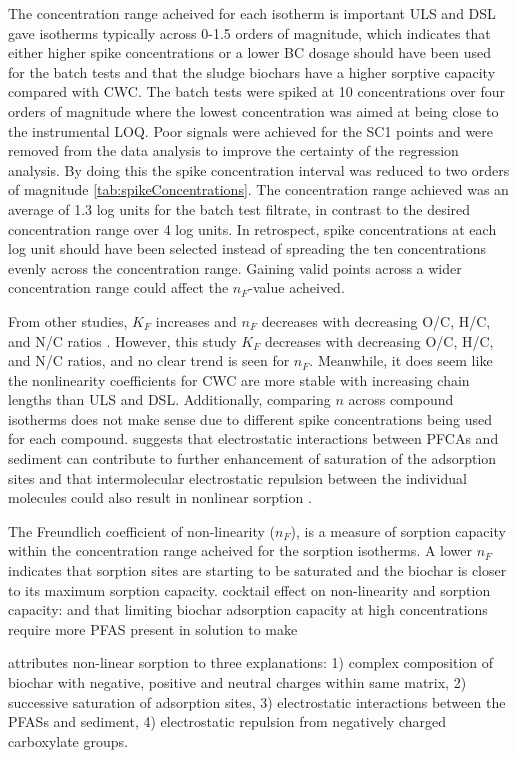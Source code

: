 The concentration range acheived for each isotherm is important  ULS and DSL gave isotherms typically across 0-1.5 orders of magnitude, which indicates that either higher spike concentrations or a lower BC dosage should have been used for the batch tests and that the sludge biochars have a higher sorptive capacity compared with CWC. The batch tests were spiked at 10 concentrations over four orders of magnitude where the lowest concentration was aimed at being close to the instrumental LOQ. Poor signals were achieved for the SC1 points and were removed from the data analysis to improve the certainty of the regression analysis. By doing this the spike concentration interval was reduced to two orders of magnitude \cref{tab:spikeConcentrations}. The concentration range achieved was an average of 1.3 log units for the batch test filtrate, in contrast to the desired concentration range over 4 log units. In retrospect, spike concentrations at each log unit should have been selected instead of spreading the ten concentrations evenly across the concentration range. Gaining valid points across a wider concentration range could affect the $n_F$-value acheived.

From other studies, $K_F$ increases and $n_F$ decreases with decreasing O/C, H/C, and N/C ratios \citep{Cornelissen2005}. However, this study $K_F$ decreases with decreasing O/C, H/C, and N/C ratios, and no clear trend is seen for $n_F$. Meanwhile, it does seem like the nonlinearity coefficients for CWC are more stable with increasing chain lengths than ULS and DSL. Additionally, comparing $n$ across compound isotherms does not make sense due to different spike concentrations being used for each compound. \citep{yin2022insights} suggests that electrostatic interactions between PFCAs and sediment can contribute to further enhancement of saturation of the adsorption sites and that intermolecular electrostatic repulsion between the individual molecules could also result in nonlinear sorption \citep{higgins2006sorption,yin2022insights}.

The Freundlich coefficient of non-linearity ($n_F$), is a measure of sorption capacity within the concentration range acheived for the sorption isotherms. A lower $n_F$ indicates that sorption sites are starting to be saturated and the biochar is closer to its maximum sorption capacity. cocktail effect on non-linearity and sorption capacity: and that limiting biochar adsorption capacity at high concentrations require more PFAS present in solution to make

\citep{yin2022insights} attributes non-linear sorption to three explanations: 1) complex composition of biochar with negative, positive and neutral charges within same matrix, 2) successive saturation of adsorption sites, 3) electrostatic interactions between the PFASs and sediment, 4) electrostatic repulsion from negatively charged carboxylate groups. 

